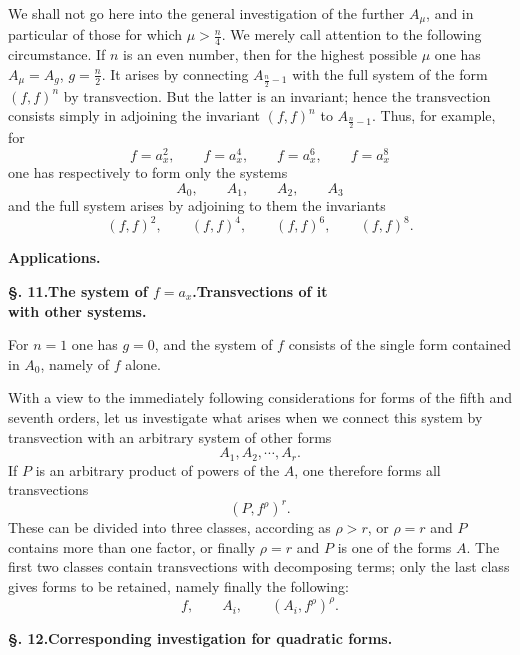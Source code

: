 \documentclass[10pt]{article}
\providecommand{\bdots}{\cdots}
\begin{document}
We shall not go here into the general investigation of the further $A_\mu$, and in particular of those for which $\mu>\frac n4$. We merely call attention to the following circumstance. If $n$ is an even number, then for the highest possible $\mu$ one has $A_\mu=A_g$, $g=\frac n2$. It arises by connecting $A_{\frac n2-1}$ with the full system of the form $(f,f)^n$ by transvection. But the latter is an invariant; hence the transvection consists simply in adjoining the invariant $(f,f)^n$ to $A_{\frac n2-1}$. Thus, for example, for
\[
f=a_x^2,
\qquad f=a_x^4,
\qquad f=a_x^6,
\qquad f=a_x^8
\]
one has respectively to form only the systems
\[
A_0,
\qquad A_1,
\qquad A_2,
\qquad A_3
\]
and the full system arises by adjoining to them the invariants
\[
(f,f)^2,
\qquad (f,f)^4,
\qquad (f,f)^6,
\qquad (f,f)^8.
\]

\begin{center}
{\bfseries Applications.}
\end{center}

\begin{center}
{\bfseries §. 11.\quad The system of $f=a_x$.\quad Transvections of it\\with other systems.}
\end{center}

For $n=1$ one has $g=0$, and the system of $f$ consists of the single form contained in $A_0$, namely of $f$ alone.

With a view to the immediately following considerations for forms of the fifth and seventh orders, let us investigate what arises when we connect this system by transvection with an arbitrary system of other forms
\[
A_1,A_2,\bdots,A_r.
\]
If $P$ is an arbitrary product of powers of the $A$, one therefore forms all transvections
\[
(P,f^\rho)^r.
\]
These can be divided into three classes, according as $\rho>r$, or $\rho=r$ and $P$ contains more than one factor, or finally $\rho=r$ and $P$ is one of the forms $A$. The first two classes contain transvections with decomposing terms; only the last class gives forms to be retained, namely finally the following:
\[
f,
\qquad A_i,
\qquad (A_i,f^\rho)^\rho.
\]

\begin{center}
{\bfseries §. 12.\quad Corresponding investigation for quadratic forms.}
\end{center}
\end{document}

